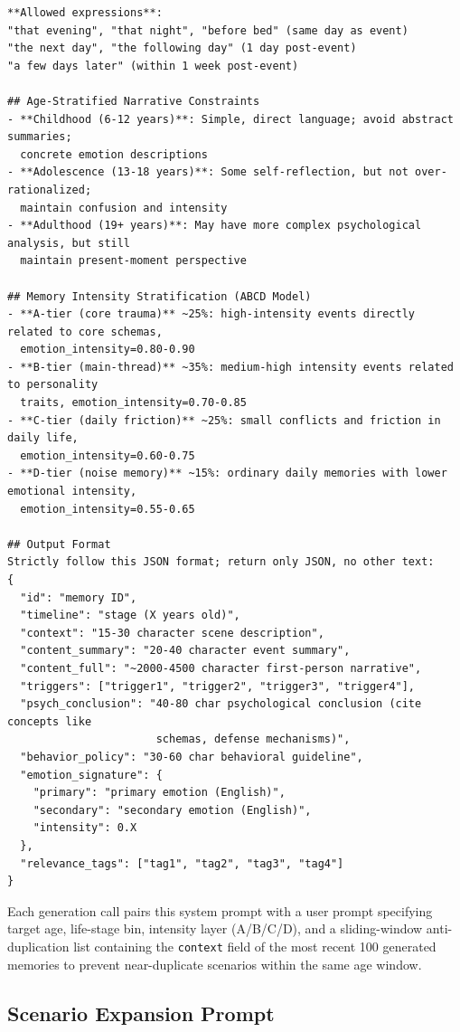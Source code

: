 \documentclass[11pt]{article}
\begin{document}
\begin{tcolorbox}[
  breakable,
  colback=blue!5,
  colframe=blue!60!black,
  title={\textbf{Memory Generation System Prompt (Claude Sonnet 4.6)}},
  fonttitle=\bfseries,
  rounded corners,
  boxrule=1.0pt
]
\begin{Verbatim}[fontsize=\scriptsize, breaklines=true, breaksymbolleft={}, breaksymbolright={}, breakindent=1em]
**Allowed expressions**:
"that evening", "that night", "before bed" (same day as event)
"the next day", "the following day" (1 day post-event)
"a few days later" (within 1 week post-event)

## Age-Stratified Narrative Constraints
- **Childhood (6-12 years)**: Simple, direct language; avoid abstract summaries;
  concrete emotion descriptions
- **Adolescence (13-18 years)**: Some self-reflection, but not over-rationalized;
  maintain confusion and intensity
- **Adulthood (19+ years)**: May have more complex psychological analysis, but still
  maintain present-moment perspective

## Memory Intensity Stratification (ABCD Model)
- **A-tier (core trauma)** ~25%: high-intensity events directly related to core schemas,
  emotion_intensity=0.80-0.90
- **B-tier (main-thread)** ~35%: medium-high intensity events related to personality
  traits, emotion_intensity=0.70-0.85
- **C-tier (daily friction)** ~25%: small conflicts and friction in daily life,
  emotion_intensity=0.60-0.75
- **D-tier (noise memory)** ~15%: ordinary daily memories with lower emotional intensity,
  emotion_intensity=0.55-0.65

## Output Format
Strictly follow this JSON format; return only JSON, no other text:
{
  "id": "memory ID",
  "timeline": "stage (X years old)",
  "context": "15-30 character scene description",
  "content_summary": "20-40 character event summary",
  "content_full": "~2000-4500 character first-person narrative",
  "triggers": ["trigger1", "trigger2", "trigger3", "trigger4"],
  "psych_conclusion": "40-80 char psychological conclusion (cite concepts like
                       schemas, defense mechanisms)",
  "behavior_policy": "30-60 char behavioral guideline",
  "emotion_signature": {
    "primary": "primary emotion (English)",
    "secondary": "secondary emotion (English)",
    "intensity": 0.X
  },
  "relevance_tags": ["tag1", "tag2", "tag3", "tag4"]
}
\end{Verbatim}
\end{tcolorbox}

Each generation call pairs this system prompt with a user prompt specifying target age, life-stage bin, intensity layer (A/B/C/D), and a sliding-window anti-duplication list containing the \texttt{context} field of the most recent 100 generated memories to prevent near-duplicate scenarios within the same age window.

\subsection{Scenario Expansion Prompt}
\label{app:prompt_scenario}
\end{document}

